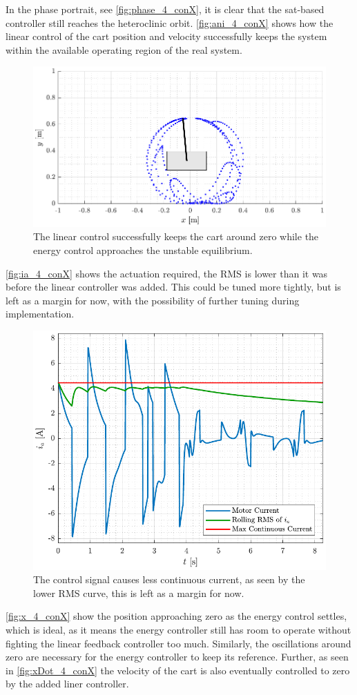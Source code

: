 %
In the phase portrait, see \autoref{fig:phase_4_conX}, it is clear that the sat-based controller still reaches the heteroclinic orbit.
\autoref{fig:ani_4_conX} shows how the linear control of the cart position and velocity successfully keeps the system within the available operating region of the real system.
%
\begin{figure}[H]
  \includegraphics[width=.52\textwidth]{figures/ani_4_conX}
  \caption{The linear control successfully keeps the cart around zero while the energy control approaches the unstable equilibrium.}
  \label{fig:ani_4_conX}
\end{figure}
%
\autoref{fig:ia_4_conX} shows the actuation required, the RMS is lower than it was before the linear controller was added. This could be tuned more tightly, but is left as a margin for now, with the possibility of further tuning during implementation.
%
\begin{figure}[H]
  \includegraphics[width=.52\textwidth]{figures/ia_4_conX}
  \caption{The control signal causes less continuous current, as seen by the lower RMS curve, this is left as a margin for now.}
  \label{fig:ia_4_conX}
\end{figure}
%
\autoref{fig:x_4_conX} show the position approaching zero as the energy control settles, which is ideal, as it means the energy controller still has room to operate without fighting the linear feedback controller too much. Similarly, the oscillations around zero are necessary for the energy controller to keep its reference. Further, as seen in \autoref{fig:xDot_4_conX} the velocity of the cart is also eventually controlled to zero by the added liner controller.
